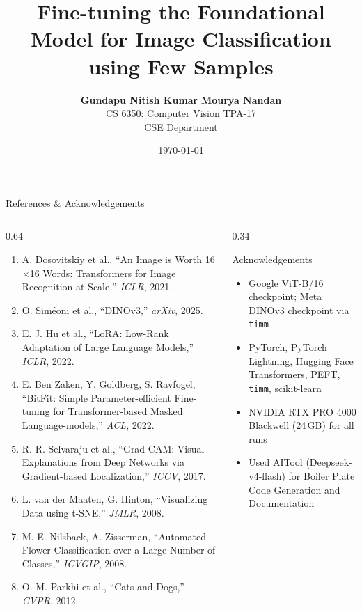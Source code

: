\documentclass[10pt, aspectratio=169]{beamer}
\title[Few-Shot Classification]{Fine-tuning the Foundational Model for Image Classification using Few Samples}
\subtitle{}
\author[Gundapu \& Nandan]{
  \textbf{Gundapu Nitish Kumar} \quad \textbf{Mourya Nandan} \\[0.18cm]
  \small CS 6350: Computer Vision \quad TPA-17 \\[0.04cm]
  \small CSE Department
}
\institute[IITM]{IIT Madras}
\date{\today}
\begin{document}
\begin{frame}[plain]
  \titlepage
\end{frame}

\begin{frame}[t]{References \& Acknowledgements}
  \begin{columns}[T]
    \begin{column}{0.64\textwidth}
      {\scriptsize
      \begin{enumerate}
        \setlength{\itemsep}{1pt}
        \item A. Dosovitskiy et al., ``An Image is Worth 16$\times$16 Words: Transformers for Image Recognition at Scale,'' \emph{ICLR}, 2021.
        \item O. Sim\'eoni et al., ``DINOv3,'' \emph{arXiv}, 2025.
        \item E. J. Hu et al., ``LoRA: Low-Rank Adaptation of Large Language Models,'' \emph{ICLR}, 2022.
        \item E. Ben Zaken, Y. Goldberg, S. Ravfogel, ``BitFit: Simple Parameter-efficient Fine-tuning for Transformer-based Masked Language-models,'' \emph{ACL}, 2022.
        \item R. R. Selvaraju et al., ``Grad-CAM: Visual Explanations from Deep Networks via Gradient-based Localization,'' \emph{ICCV}, 2017.
        \item L. van der Maaten, G. Hinton, ``Visualizing Data using t-SNE,'' \emph{JMLR}, 2008.
        \item M.-E. Nilsback, A. Zisserman, ``Automated Flower Classification over a Large Number of Classes,'' \emph{ICVGIP}, 2008.
        \item O. M. Parkhi et al., ``Cats and Dogs,'' \emph{CVPR}, 2012.
      \end{enumerate}}
    \end{column}
    \begin{column}{0.34\textwidth}
      \begin{block}{Acknowledgements}
        \footnotesize
        \begin{itemize}
          \item Google ViT-B/16 checkpoint; Meta DINOv3 checkpoint via \texttt{timm}
          \item PyTorch, PyTorch Lightning, Hugging Face Transformers, PEFT, \texttt{timm}, scikit-learn
          \item NVIDIA RTX PRO 4000 Blackwell (24\,GB) for all runs
          \item Used AITool (Deepseek-v4-flash) for Boiler Plate Code Generation and Documentation
        \end{itemize}
      \end{block}
    \end{column}
  \end{columns}
\end{frame}
\end{document}
